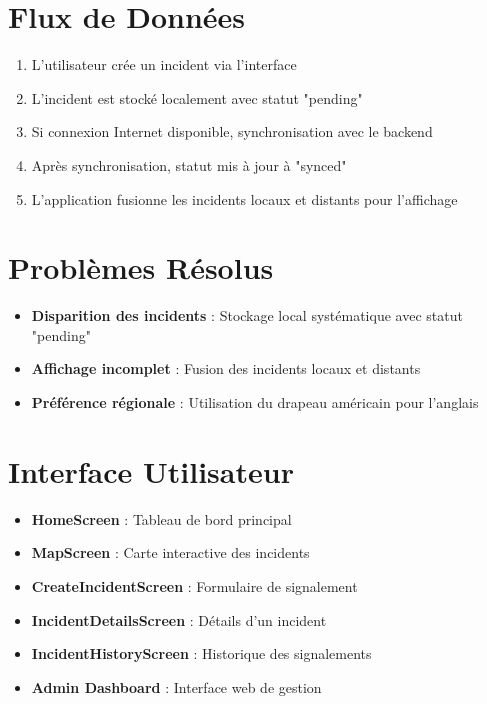 \documentclass[12pt,a4paper]{article}
\begin{document}
\section*{Flux de Données}

\begin{enumerate}
    \item L'utilisateur crée un incident via l'interface
    \item L'incident est stocké localement avec statut "pending"
    \item Si connexion Internet disponible, synchronisation avec le backend
    \item Après synchronisation, statut mis à jour à "synced"
    \item L'application fusionne les incidents locaux et distants pour l'affichage
\end{enumerate}

\section*{Problèmes Résolus}

\begin{itemize}
    \item \textbf{Disparition des incidents} : Stockage local systématique avec statut "pending"
    \item \textbf{Affichage incomplet} : Fusion des incidents locaux et distants
    \item \textbf{Préférence régionale} : Utilisation du drapeau américain pour l'anglais
\end{itemize}

\section*{Interface Utilisateur}

\begin{itemize}
    \item \textbf{HomeScreen} : Tableau de bord principal
    \item \textbf{MapScreen} : Carte interactive des incidents
    \item \textbf{CreateIncidentScreen} : Formulaire de signalement
    \item \textbf{IncidentDetailsScreen} : Détails d'un incident
    \item \textbf{IncidentHistoryScreen} : Historique des signalements
    \item \textbf{Admin Dashboard} : Interface web de gestion
\end{itemize}
\end{document}
